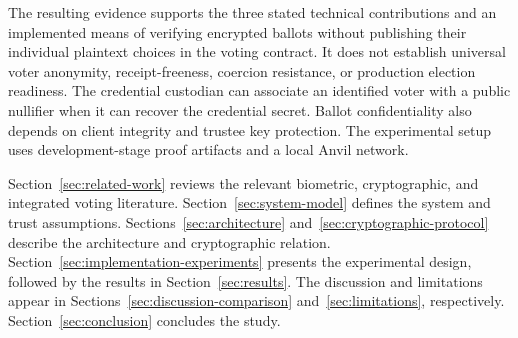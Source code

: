 The resulting evidence supports the three stated technical contributions and an implemented means of verifying encrypted ballots without publishing their individual plaintext choices in the voting contract. It does not establish universal voter anonymity, receipt-freeness, coercion resistance, or production election readiness. The credential custodian can associate an identified voter with a public nullifier when it can recover the credential secret. Ballot confidentiality also depends on client integrity and trustee key protection. The experimental setup uses development-stage proof artifacts and a local Anvil network.

Section~\ref{sec:related-work} reviews the relevant biometric, cryptographic, and integrated voting literature. Section~\ref{sec:system-model} defines the system and trust assumptions. Sections~\ref{sec:architecture} and~\ref{sec:cryptographic-protocol} describe the architecture and cryptographic relation. Section~\ref{sec:implementation-experiments} presents the experimental design, followed by the results in Section~\ref{sec:results}. The discussion and limitations appear in Sections~\ref{sec:discussion-comparison} and~\ref{sec:limitations}, respectively. Section~\ref{sec:conclusion} concludes the study.